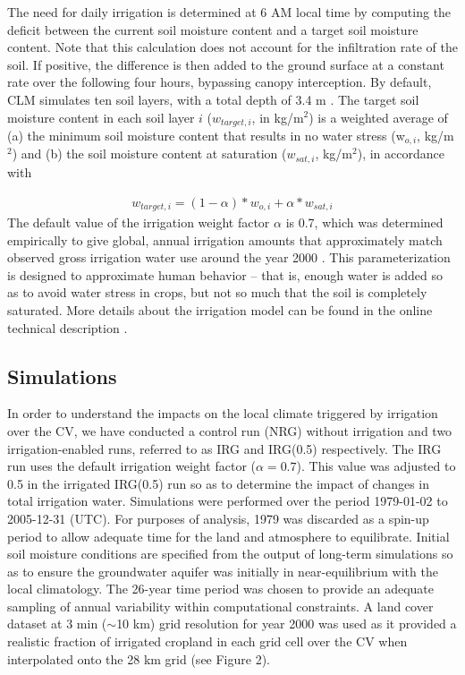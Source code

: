 \documentclass[draft,ms]{agutex}   %
\begin{document}
\begin{article}
The need for daily irrigation is determined at 6 AM local time by computing the deficit between the current soil moisture content and a target soil moisture content.  Note that this calculation does not account for the infiltration rate of the soil. If positive, the difference is then added to the ground surface at a constant rate over the following four hours, bypassing canopy interception. By default, CLM simulates ten soil layers, with a total depth of 3.4 m \citep{CLM40Tech}. The target soil moisture content in each soil layer $i$ ($w_{target, i}$, in kg/m$^2$) is a weighted average of (a) the minimum soil moisture content that results in no water stress (w$_{o,i}$, kg/m$^2$) and (b) the soil moisture content at saturation ($w_{sat,i}$, kg/m$^2$), in accordance with

\begin{align} \label{eq:TargetSoilMoisture}
w_{target,i} = (1-{\alpha})*w_{o,i} + {\alpha}*w_{sat,i}
\end{align} The default value of the irrigation weight factor $\alpha$ is 0.7, which was determined empirically to give global, annual irrigation amounts that approximately match observed gross irrigation water use around the year 2000 \citep{shiklomanov2000appraisal}. This parameterization is designed to approximate human behavior -- that is, enough water is added so as to avoid water stress in crops, but not so much that the soil is completely saturated. More details about the irrigation model can be found in the online technical description \citep{irrigationTechnicCLM}.

\subsection{Simulations}

In order to understand the impacts on the local climate triggered by irrigation over the CV, we have conducted a control run (NRG) without irrigation and two irrigation-enabled runs, referred to as IRG and IRG(0.5) respectively. The IRG run uses the default irrigation weight factor ($\alpha = 0.7$).  This value was adjusted to 0.5 in the irrigated IRG(0.5) run so as to determine the impact of changes in total irrigation water. Simulations were performed over the period 1979-01-02 to 2005-12-31 (UTC).  For purposes of analysis, 1979 was discarded as a spin-up period to allow adequate time for the land and atmosphere to equilibrate.  Initial soil moisture conditions are specified from the output of long-term simulations so as to ensure the groundwater aquifer was initially in near-equilibrium with the local climatology. The 26-year time period was chosen to provide an adequate sampling of annual variability within computational constraints. A land cover dataset at 3 min ($\sim$10 km) grid resolution for year 2000 was used as it provided a realistic fraction of irrigated cropland in each grid cell over the CV when interpolated onto the 28 km grid (see Figure 2). 


\end{article}
\end{document}
